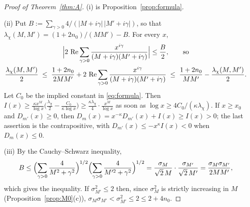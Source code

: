 \documentclass[11pt]{amsart}
\theoremstyle{definition}
\numberwithin{equation}{section}
\newcommand{\re}{\operatorname{Re}}
\begin{document}
\begin{proof}[Proof of Theorem~\ref{thm:A}]
(i) is Proposition~\ref{prop:formula}.

(ii) Put $B:=\sum_{\gamma>0}4/(|M+i\gamma|\,|M'+i\gamma|)$, so that
$\lambda_\chi(M,M')=(1+2n_0)/(MM')-B$. For every $x$,
\begin{equation}\label{eq:bracketbounds}
\begin{gathered}
\Bigl|2\,\re\sum_{\gamma>0}\frac{x^{i\gamma}}{(M+i\gamma)(M'+i\gamma)}
\Bigr|\le\frac B2,
\qquad\text{so}\\
\frac{\lambda_\chi(M,M')}{2}\;\le\;
\frac{1+2n_0}{2MM'}
+2\,\re\sum_{\gamma>0}\frac{x^{i\gamma}}{(M+i\gamma)(M'+i\gamma)}
\;\le\;\frac{1+2n_0}{MM'}-\frac{\lambda_\chi(M,M')}{2}.
\end{gathered}
\end{equation}
Let $C_0$ be the implied constant in \eqref{eq:formula}. Then
$I(x)\ge\frac{\kappa x^M}{\log x}\bigl(\frac{\lambda_\chi}{2}
-\frac{C_0}{\kappa\log x}\bigr)\ge\frac{\kappa\lambda_\chi}{4}\cdot
\frac{x^M}{\log x}$ as soon as $\log x\ge4C_0/(\kappa\lambda_\chi)$.
If $x\ge x_0$ and $D_{m'}(x)\ge0$, then
$D_m(x)=x^{-\kappa}D_{m'}(x)+I(x)\ge I(x)>0$; the last assertion is
the contrapositive, with $D_{m'}(x)\le-x^{\kappa}I(x)<0$ when
$D_m(x)\le0$.

(iii) By the Cauchy--Schwarz inequality,
\[
B\le\Bigl(\sum_{\gamma>0}\frac{4}{M^2+\gamma^2}\Bigr)^{1/2}
\Bigl(\sum_{\gamma>0}\frac{4}{M'^2+\gamma^2}\Bigr)^{1/2}
=\frac{\sigma_M}{\sqrt2\,M}\cdot\frac{\sigma_{M'}}{\sqrt2\,M'}
=\frac{\sigma_M\sigma_{M'}}{2MM'} ,
\]
which gives the inequality. If $\sigma_{M'}^2\le2$ then, since
$\sigma_M^2$ is strictly increasing in $M$
(Proposition~\ref{prop:M0}(c)), $\sigma_M\sigma_{M'}<\sigma_{M'}^2\le2
\le2+4n_0$.
\end{proof}
\end{document}
